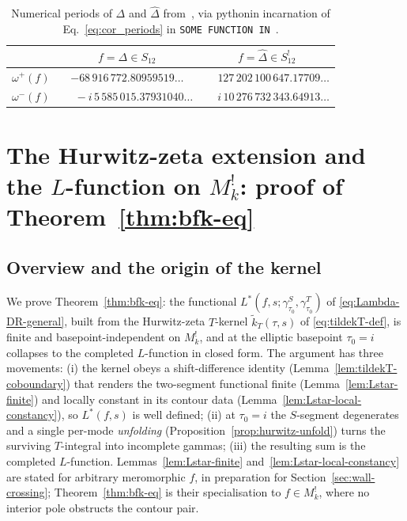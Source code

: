 \documentclass[11pt]{article}
\numberwithin{equation}{section}  %
\newcommand{\Dhat}{\widehat{\Delta}}
\begin{document}
\begin{table}[h]
\centering
\begin{tabular}{c|cc}
& $f = \Delta \in S_{12}$
& $f = \Dhat \in S_{12}^!$ \\
\hline
$\omega^+(f)$    & $-68\,916\,772.80959519\ldots$  & $\phantom{-}127\,202\,100\,647.17709\ldots$ \\
$\omega^-(f)$  & $\phantom{-}-i\,5\,585\,015.37931040\ldots$   & $\phantom{-}i\,10\,276\,732\,343.64913\ldots$ \\
\end{tabular}
\caption{Numerical periods of $\Delta$ and $\Dhat$ from~\cite{Brown2017},
via pythonin incarnation of Eq.~\eqref{eq:cor_periods} in \texttt{SOME FUNCTION IN}~\cite{VerifyScripts}.}
\label{tab:k12-periods}
\end{table}


\section{The Hurwitz-zeta extension and the $L$-function on $M^!_k$: proof of Theorem~\ref{thm:bfk-eq}}\label{sec:hurwitz-extension}

\subsection{Overview and the origin of the kernel}\label{subsec:hurwitz-overview}

We prove Theorem~\ref{thm:bfk-eq}: the functional
$L^*(f, s; \gamma^S_{\tau_0}, \gamma^T_{\tau_0})$ of
\eqref{eq:Lambda-DR-general}, built from the Hurwitz-zeta $T$-kernel
$\widetilde{k}_T(\tau, s)$ of \eqref{eq:tildekT-def}, is finite and
basepoint-independent on $M^!_k$, and at the elliptic basepoint
$\tau_0 = i$ collapses to the completed $L$-function in closed form.
The argument has three movements: (i) the kernel obeys a
shift-difference identity (Lemma~\ref{lem:tildekT-coboundary}) that
renders the two-segment functional finite (Lemma~\ref{lem:Lstar-finite})
and locally constant in its contour data
(Lemma~\ref{lem:Lstar-local-constancy}), so $L^*(f, s)$ is well
defined; (ii) at $\tau_0 = i$ the $S$-segment degenerates and a single
per-mode \emph{unfolding} (Proposition~\ref{prop:hurwitz-unfold}) turns
the surviving $T$-integral into incomplete gammas; (iii) the resulting
sum is the completed $L$-function.  Lemmas~\ref{lem:Lstar-finite}
and~\ref{lem:Lstar-local-constancy} are stated for arbitrary
meromorphic $f$, in preparation for Section~\ref{sec:wall-crossing};
Theorem~\ref{thm:bfk-eq} is their specialisation to $f \in M^!_k$,
where no interior pole obstructs the contour pair.
\end{document}

